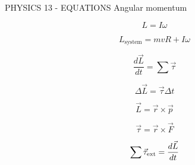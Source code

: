 PHYSICS 13 - EQUATIONS
Angular momentum

$$L = I\omega$$

$$L_{\text{system}} = mvR + I\omega$$

$$\frac{d\vec L}{dt} = \sum\vec\tau$$

$$\Delta\vec L = \vec\tau \Delta t$$


$$\vec L=\vec r\times\vec p$$

$$\vec\tau=\vec r\times\vec F$$

$$\sum\vec\tau_{\rm ext}=\frac{d\vec L}{dt}$$
